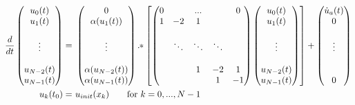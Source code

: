 \documentclass{scrartcl}[12pt, halfparskip]
\numberwithin{equation}{section}
\numberwithin{figure}{section}
\numberwithin{table}{section}
\begin{document}
\begin{align}
	\frac{d}{dt}
	\begin{pmatrix}
		u_0(t) \\
		u_1(t) \\
		\\
		\vdots \\
		\\
		u_{N-2}(t) \\
		u_{N-1}(t)
	\end{pmatrix}
	= & \
	\begin{pmatrix}
	0 \\
	\alpha(u_1(t)) \\
	\\
	\vdots
	\\
	\\
	\alpha(u_{N-2}(t)) \\
	\alpha(u_{N-1}(t))
	\end{pmatrix}
	. \hspace{-0.1cm} * \left[
	\begin{pmatrix}
		0 & & ... & & 0 \\
		1 & -2 & 1 \\
		\\
		& \ddots & \ddots & \ddots \\
		\\
		& & 1 & -2 & 1 \\
		& & & 1 & -1
	\end{pmatrix}
	\begin{pmatrix}
	u_0(t) \\
	u_1(t) \\
	\\
	\vdots \\
	\\
	u_{N-2}(t) \\
	u_{N-1}(t)
	\end{pmatrix} \right]
	+
	\begin{pmatrix}
		\dot{u}_a(t) \\
		0 \\
		\\
		\vdots \\
		\\
		\\
		0
	\end{pmatrix} \\
	u_k(t_0) = & \ u_{init}(x_k) \qquad \text{for} \ k = 0,...,N-1 \nonumber
\end{align}
 
\end{document}
